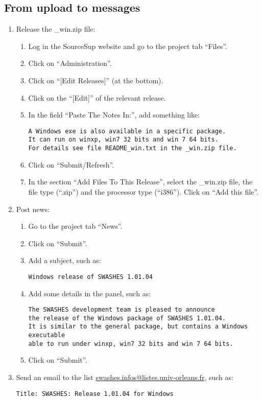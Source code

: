 \documentclass[a4paper, 11pt]{article}
\begin{document}
\subsection{From upload to messages}
\begin{enumerate}
\item Release the \_win.zip file:
\begin{enumerate}
\item Log in the SourceSup website and go to the project tab ``Files''.
\item Click on ``Administration''.
\item Click on ``[Edit Releases]'' (at the bottom).
\item Click on the ``[Edit]'' of the relevant release.
\item In the field ``Paste The Notes In:'', add something like:
\begin{verbatim}
A Windows exe is also available in a specific package.
It can run on winxp, win7 32 bits and win 7 64 bits.
For details see file README_win.txt in the _win.zip file.
\end{verbatim}
\item Click on ``Submit/Refresh''.
\item In the section ``Add Files To This Release'', select the \_win.zip file,
the file type (``.zip'') and the processor type  (``i386''). Click on ``Add this file''.
\end{enumerate}
\item Post news:
\begin{enumerate}
\item Go to the project tab ``News''.
\item Click on ``Submit''.
\item Add a subject, such as:
\begin{verbatim}
Windows release of SWASHES 1.01.04 
\end{verbatim}
\item Add some details in the panel, such as:
\begin{verbatim}
The SWASHES development team is pleased to announce
the release of the Windows package of SWASHES 1.01.04.
It is similar to the general package, but contains a Windows executable 
able to run under winxp, win7 32 bits and win 7 64 bits.
\end{verbatim}
\item Click on ``Submit''.
\end{enumerate}
\item Send an email to the list
\href{mailto:swashes.infos@listes.univ-orleans.fr}{swashes.infos@listes.univ-orleans.fr}, such as:
\begin{verbatim}
Title: SWASHES: Release 1.01.04 for Windows


\end{verbatim}
\end{enumerate}
\end{document}

